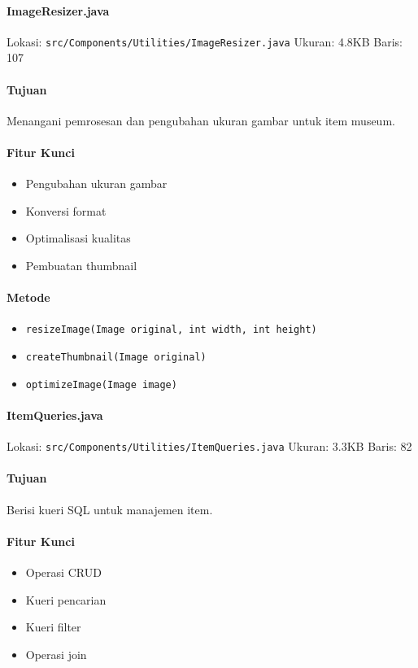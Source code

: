 \documentclass[12pt,a4paper]{article}
\begin{document}
\paragraph{ImageResizer.java}
Lokasi: \texttt{src/Components/Utilities/ImageResizer.java}
Ukuran: 4.8KB
Baris: 107

\paragraph{Tujuan}
Menangani pemrosesan dan pengubahan ukuran gambar untuk item museum.

\paragraph{Fitur Kunci}
\begin{itemize}
    \item Pengubahan ukuran gambar
    \item Konversi format
    \item Optimalisasi kualitas
    \item Pembuatan thumbnail
\end{itemize}

\paragraph{Metode}
\begin{itemize}
    \item \texttt{resizeImage(Image original, int width, int height)}
    \item \texttt{createThumbnail(Image original)}
    \item \texttt{optimizeImage(Image image)}
\end{itemize}

\paragraph{ItemQueries.java}
Lokasi: \texttt{src/Components/Utilities/ItemQueries.java}
Ukuran: 3.3KB
Baris: 82

\paragraph{Tujuan}
Berisi kueri SQL untuk manajemen item.

\paragraph{Fitur Kunci}
\begin{itemize}
    \item Operasi CRUD
    \item Kueri pencarian
    \item Kueri filter
    \item Operasi join
\end{itemize}
\end{document}
